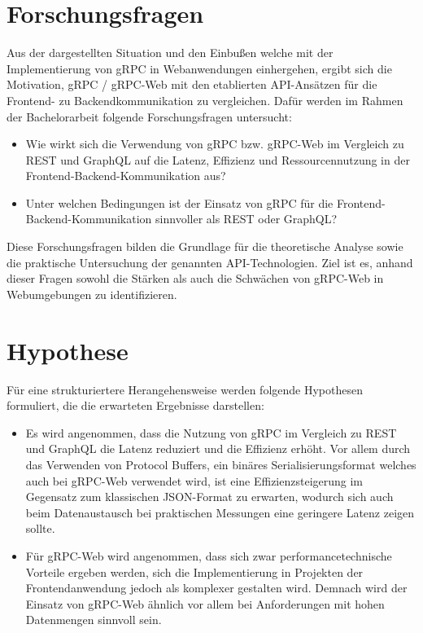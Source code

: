 \section{Forschungsfragen}
Aus der dargestellten Situation und den Einbußen welche mit der Implementierung von
gRPC in Webanwendungen einhergehen, ergibt sich die Motivation, gRPC /
gRPC-Web mit den etablierten API-Ansätzen für die Frontend- zu Backendkommunikation zu vergleichen. Dafür werden im Rahmen der Bachelorarbeit folgende Forschungsfragen untersucht:

\begin{itemize}
	\item Wie wirkt sich die Verwendung von gRPC bzw. gRPC-Web im Vergleich zu REST
	und GraphQL auf die Latenz, Effizienz und Ressourcennutzung in der Frontend-Backend-Kommunikation aus?
	
	\item Unter welchen Bedingungen ist der Einsatz von gRPC für die
	Frontend-Backend-Kommunikation sinnvoller als REST oder GraphQL?
	
\end{itemize}

Diese Forschungsfragen bilden die Grundlage für die theoretische Analyse sowie die
praktische Untersuchung der genannten API-Technologien. Ziel ist es, anhand dieser
Fragen sowohl die Stärken als auch die Schwächen von gRPC-Web in Webumgebungen
zu identifizieren.


\section{Hypothese}
Für eine strukturiertere Herangehensweise werden folgende Hypothesen formuliert, die
die erwarteten Ergebnisse darstellen:

\begin{itemize}
	\item Es wird angenommen, dass die Nutzung von gRPC im Vergleich zu REST und
	GraphQL die Latenz reduziert und die Effizienz erhöht. Vor allem durch das Verwenden
	von Protocol Buffers, ein binäres Serialisierungsformat welches auch
	bei gRPC-Web verwendet wird, ist eine Effizienzsteigerung im Gegensatz zum klassischen JSON-Format zu erwarten, wodurch sich auch beim Datenaustausch bei praktischen Messungen eine geringere Latenz zeigen sollte.
	
	\item Für gRPC-Web wird angenommen, dass sich zwar performancetechnische Vorteile
	ergeben werden, sich die Implementierung in Projekten der Frontendanwendung
	jedoch als komplexer gestalten wird. Demnach wird der Einsatz von gRPC-Web ähnlich vor allem bei Anforderungen mit hohen Datenmengen sinnvoll sein.

	
\end{itemize}

